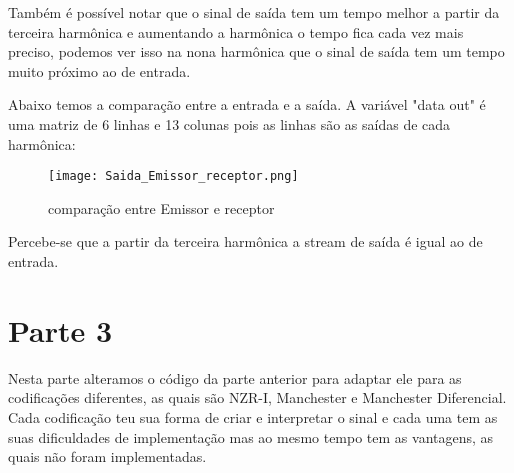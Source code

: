 \documentclass{article}
\begin{document}
        Também é possível notar que o sinal de saída tem um tempo melhor a partir da terceira harmônica e aumentando a harmônica o tempo fica cada vez mais preciso, podemos ver isso na nona harmônica que o sinal de saída tem um tempo muito próximo ao de entrada.
        
        Abaixo temos a comparação entre a entrada e a saída. A variável "data out" é uma matriz de 6 linhas e 13 colunas pois as linhas são as saídas de cada harmônica:
        \begin{figure}[H]
            \begin{center}
                \texttt{[image: Saida\_Emissor\_receptor.png]}
                \caption{comparação entre Emissor e receptor}
                \label{fig:Saida_Emissor_receptor}
            \end{center}
        \end{figure}
        Percebe-se que a partir da terceira harmônica a stream de saída é igual ao de entrada.
    \section{Parte 3}
        Nesta parte alteramos o código da parte anterior para adaptar ele para as codificações diferentes, as quais são NZR-I, Manchester e Manchester Diferencial. Cada codificação teu sua forma de criar e interpretar o sinal e cada uma tem as suas dificuldades de implementação mas ao mesmo tempo tem as vantagens, as quais não foram implementadas.
        
\end{document}
